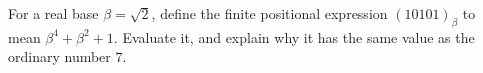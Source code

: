 For a real base $\beta=\sqrt2$, define the finite positional expression $(10101)_\beta$ to mean $\beta^4+\beta^2+1$. Evaluate it, and explain why it has the same value as the ordinary number $7$.
